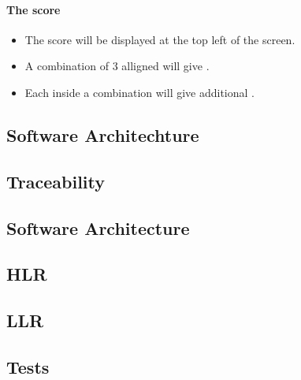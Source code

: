 \paragraph{The score}

\begin{itemize}
\item The score will be displayed at the top left of the screen.
\item A combination of 3 alligned \sqs will give \threepts \pts.
\item Each \sq inside a combination will give \sqpts additional \pts.
\end{itemize}

\subsection{Software Architechture}



\subsection{Traceability}



\subsection{Software Architecture}

\subsection{HLR}

\subsection{LLR}

\subsection{Tests}

\newpage
